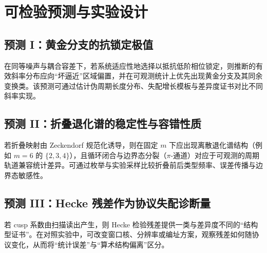 \section{可检验预测与实验设计}

\subsection{预测 I：黄金分支的抗锁定极值}

在同等噪声与耦合容差下，若系统适应性地选择以抵抗低阶相位锁定，则推断的有效斜率分布应向“坏逼近”区域偏置，并在可观测统计上优先出现黄金分支及其同余变换类。该预测可通过估计伪周期长度分布、失配增长模板与差异度证书对比不同斜率实现。

\subsection{预测 II：折叠退化谱的稳定性与容错性质}

若折叠映射由 Zeckendorf 规范化诱导，则在固定 $m$ 下应出现离散退化谱结构（例如 $m=6$ 的 $\{2,3,4\}$），且循环闭合与边界态分裂（$\pi$-通道）对应于可观测的周期轨道兼容统计差异。可通过枚举与实验采样比较折叠前后类型频率、误差传播与边界态敏感性。

\subsection{预测 III：Hecke 残差作为协议失配诊断量}

若 cusp 系数由扫描读出产生，则 Hecke 检验残差提供一类与差异度不同的“结构型证书”。在对照实验中，可改变窗口核、分辨率或编址方案，观察残差如何随协议变化，从而将“统计误差”与“算术结构偏离”区分。

